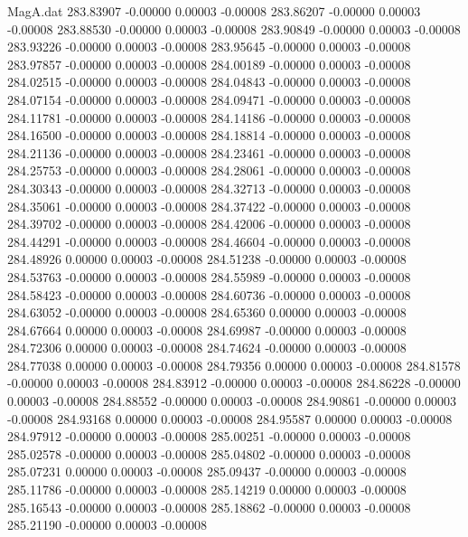 \begin{filecontents}{MagA.dat}
 283.83907   -0.00000    0.00003   -0.00008
 283.86207   -0.00000    0.00003   -0.00008
 283.88530   -0.00000    0.00003   -0.00008
 283.90849   -0.00000    0.00003   -0.00008
 283.93226   -0.00000    0.00003   -0.00008
 283.95645   -0.00000    0.00003   -0.00008
 283.97857   -0.00000    0.00003   -0.00008
 284.00189   -0.00000    0.00003   -0.00008
 284.02515   -0.00000    0.00003   -0.00008
 284.04843   -0.00000    0.00003   -0.00008
 284.07154   -0.00000    0.00003   -0.00008
 284.09471   -0.00000    0.00003   -0.00008
 284.11781   -0.00000    0.00003   -0.00008
 284.14186   -0.00000    0.00003   -0.00008
 284.16500   -0.00000    0.00003   -0.00008
 284.18814   -0.00000    0.00003   -0.00008
 284.21136   -0.00000    0.00003   -0.00008
 284.23461   -0.00000    0.00003   -0.00008
 284.25753   -0.00000    0.00003   -0.00008
 284.28061   -0.00000    0.00003   -0.00008
 284.30343   -0.00000    0.00003   -0.00008
 284.32713   -0.00000    0.00003   -0.00008
 284.35061   -0.00000    0.00003   -0.00008
 284.37422   -0.00000    0.00003   -0.00008
 284.39702   -0.00000    0.00003   -0.00008
 284.42006   -0.00000    0.00003   -0.00008
 284.44291   -0.00000    0.00003   -0.00008
 284.46604   -0.00000    0.00003   -0.00008
 284.48926    0.00000    0.00003   -0.00008
 284.51238   -0.00000    0.00003   -0.00008
 284.53763   -0.00000    0.00003   -0.00008
 284.55989   -0.00000    0.00003   -0.00008
 284.58423   -0.00000    0.00003   -0.00008
 284.60736   -0.00000    0.00003   -0.00008
 284.63052   -0.00000    0.00003   -0.00008
 284.65360    0.00000    0.00003   -0.00008
 284.67664    0.00000    0.00003   -0.00008
 284.69987   -0.00000    0.00003   -0.00008
 284.72306    0.00000    0.00003   -0.00008
 284.74624   -0.00000    0.00003   -0.00008
 284.77038    0.00000    0.00003   -0.00008
 284.79356    0.00000    0.00003   -0.00008
 284.81578   -0.00000    0.00003   -0.00008
 284.83912   -0.00000    0.00003   -0.00008
 284.86228   -0.00000    0.00003   -0.00008
 284.88552   -0.00000    0.00003   -0.00008
 284.90861   -0.00000    0.00003   -0.00008
 284.93168    0.00000    0.00003   -0.00008
 284.95587    0.00000    0.00003   -0.00008
 284.97912   -0.00000    0.00003   -0.00008
 285.00251   -0.00000    0.00003   -0.00008
 285.02578   -0.00000    0.00003   -0.00008
 285.04802   -0.00000    0.00003   -0.00008
 285.07231    0.00000    0.00003   -0.00008
 285.09437   -0.00000    0.00003   -0.00008
 285.11786   -0.00000    0.00003   -0.00008
 285.14219    0.00000    0.00003   -0.00008
 285.16543   -0.00000    0.00003   -0.00008
 285.18862   -0.00000    0.00003   -0.00008
 285.21190   -0.00000    0.00003   -0.00008

\end{filecontents}

